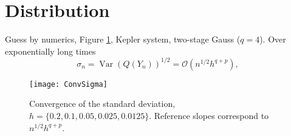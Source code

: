 \documentclass{siamart1116}
\numberwithin{theorem}{section}
\newcommand{\OO}{\mathcal{O}}
\newcommand{\Var}{\operatorname{Var}}
\begin{document}
\section{Distribution} Guess by numerics, Figure \ref{fig:StdDev}, Kepler system, two-stage Gauss ($q = 4$). Over exponentially long times
\begin{equation}
	\sigma_n = \Var(Q(Y_n))^{1/2} = \OO(n^{1/2}h^{q+p}),
\end{equation}

\begin{figure}
	\centering
	\texttt{[image: ConvSigma]}
	\caption{Convergence of the standard deviation, $h = \{0.2, 0.1, 0.05, 0.025, 0.0125\}$. Reference slopes correspond to $n^{1/2}h^{q+p}$.}
	\label{fig:StdDev}
\end{figure}



\end{document}
